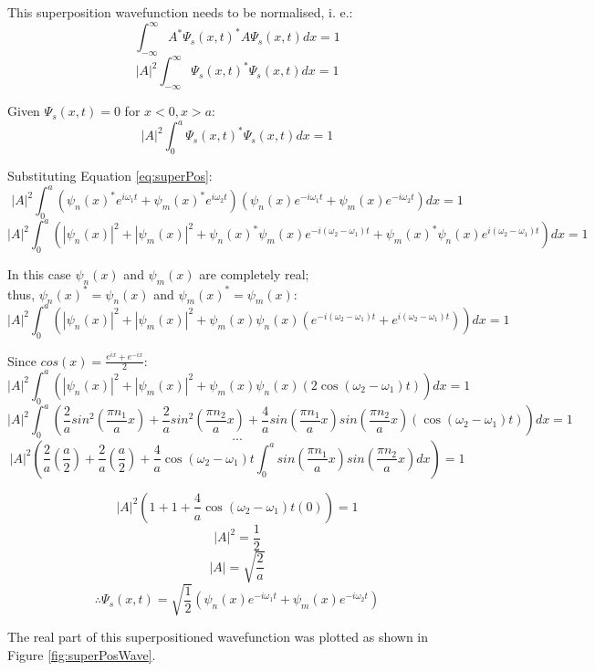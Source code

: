 This superposition wavefunction needs to be normalised, i. e.:
$$\int_{ -\infty}^{\infty} A^{*} \Psi_s (x,t)^{*} A\Psi_s (x,t)dx = 1$$
$$\left | A \right |^2 \int_{ -\infty}^{\infty} \Psi_s (x,t)^{*} \Psi_s (x,t)dx = 1$$

Given $\Psi_s (x,t)=0$ for $x<0, x>a$:
$$\left | A \right |^2 \int_{0}^{a} \Psi_s (x,t)^{*} \Psi_s (x,t)dx = 1$$

Substituting Equation \ref{eq:superPos}:
$$\left | A \right |^2 \int_{0}^{a} (\psi_n (x)^{*}e^{i \omega_{1} t} + \psi_m (x)^{*}e^{i \omega_{2} t}) (\psi_n (x)e^{-i \omega_{1} t} + \psi_m (x)e^{-i \omega_{2} t})dx = 1$$
$$\left | A \right |^2 \int_{0}^{a} (\left | \psi_n (x) \right |^2 + \left | \psi_m (x) \right |^2 + \psi_n (x)^{*}\psi_m (x)e^{-i(\omega_{2}- \omega_{1}) t} + \psi_m (x)^{*}\psi_n (x)e^{i(\omega_{2}- \omega_{1}) t})dx = 1$$

In this case $\psi_n (x)$ and $\psi_m (x)$ are completely real;\\
thus, $\psi_n (x)^{*} = \psi_n (x)$ and $\psi_m (x)^{*} = \psi_m (x)$:
$$ \left | A \right |^2 \int_{0}^{a}\left( \left | \psi_n (x) \right |^2 + \left | \psi_m (x) \right |^2 + \psi_m (x)\psi_n (x)(e^{-i(\omega_{2}- \omega_{1})t}+e^{i(\omega_{2}- \omega_{1})t})\right)dx = 1$$

Since $cos(x) = \frac{e^{ix}+e^{-ix}}{2}$:
$$ \left | A \right |^2 \int_{0}^{a}\left( \left | \psi_n (x) \right |^2 + \left | \psi_m (x) \right |^2 + \psi_m (x)\psi_n (x)(2\cos(\omega_{2}- \omega_{1})t)\right)dx = 1$$
$$ \left | A \right |^2 \int_{0}^{a}\left(\frac{2}{a} sin^{2}(\frac{\pi n_1}{a}x)+\frac{2}{a} sin^{2}(\frac{\pi n_2}{a}x)+\frac{4}{a} sin(\frac{\pi n_1}{a}x)sin(\frac{\pi n_2}{a}x)(\cos(\omega_{2}- \omega_{1})t)\right)dx = 1$$
$$...$$
$$\left | A \right |^2 \left( \frac{2}{a}\left(\frac{a}{2}\right) + \frac{2}{a}\left(\frac{a}{2}\right) + \frac{4}{a}\cos(\omega_{2}- \omega_{1})t\int_{0}^{a} sin(\frac{\pi n_1}{a}x)sin(\frac{\pi n_2}{a}x)dx \right)=1$$

$$\left | A \right |^2 \left( 1 + 1 + \frac{4}{a}\cos(\omega_{2}- \omega_{1})t(0) \right)=1$$
$$\left | A \right |^2 = \frac{1}{2}$$
$$\left | A \right | = \sqrt{\frac{2}{a}}$$
$$\therefore \Psi_s (x, t) = \sqrt{\frac{1}{2}} \left( \psi_n (x)e^{-i \omega_{1} t} + \psi_m (x)e^{-i \omega_{2} t}\right)$$

The real part of this superpositioned wavefunction was plotted as shown in Figure \ref{fig:superPosWave}.


